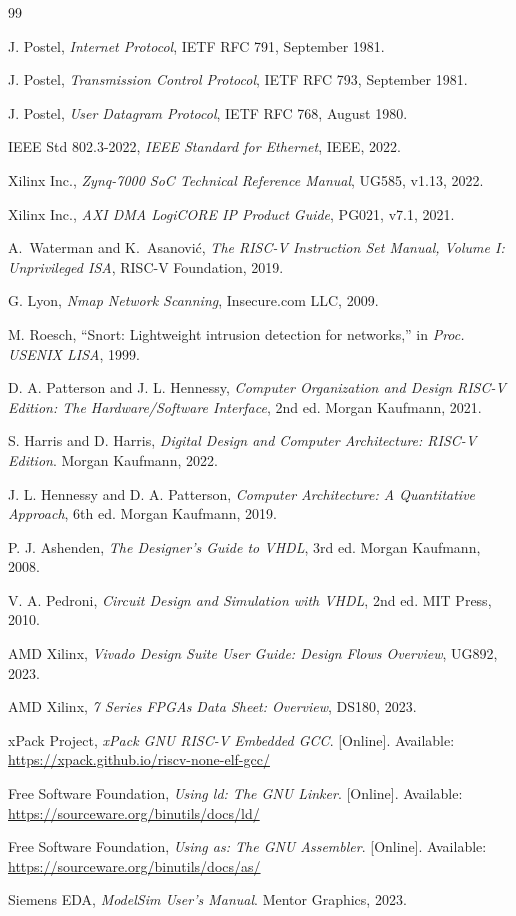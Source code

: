 \documentclass[16pt]{mythesis}
\begin{document}
\begin{thebibliography}{99}
	
	J. Postel, \textit{Internet Protocol}, IETF RFC 791, September 1981.
	
	J. Postel, \textit{Transmission Control Protocol}, IETF RFC 793, September 1981.
	
	J. Postel, \textit{User Datagram Protocol}, IETF RFC 768, August 1980.
	
	IEEE Std 802.3-2022, \textit{IEEE Standard for Ethernet}, IEEE, 2022.
	
	Xilinx Inc., \textit{Zynq-7000 SoC Technical Reference Manual}, UG585, v1.13, 2022.
	
	Xilinx Inc., \textit{AXI DMA LogiCORE IP Product Guide}, PG021, v7.1, 2021.
	
	A.~Waterman and K.~Asanovi\'c, \textit{The RISC-V Instruction Set Manual, Volume I: Unprivileged ISA}, RISC-V Foundation, 2019.
	
	G. Lyon, \textit{Nmap Network Scanning}, Insecure.com LLC, 2009.
	
	M. Roesch, ``Snort: Lightweight intrusion detection for networks,'' in \textit{Proc. USENIX LISA}, 1999.
	
	D. A. Patterson and J. L. Hennessy, \textit{Computer Organization and Design RISC-V Edition: The Hardware/Software Interface}, 2nd ed. Morgan Kaufmann, 2021.
	
	S. Harris and D. Harris, \textit{Digital Design and Computer Architecture: RISC-V Edition}. Morgan Kaufmann, 2022.
	
	J. L. Hennessy and D. A. Patterson, \textit{Computer Architecture: A Quantitative Approach}, 6th ed. Morgan Kaufmann, 2019.
	
	P. J. Ashenden, \textit{The Designer's Guide to VHDL}, 3rd ed. Morgan Kaufmann, 2008.
	
	V. A. Pedroni, \textit{Circuit Design and Simulation with VHDL}, 2nd ed. MIT Press, 2010.
	
	AMD Xilinx, \textit{Vivado Design Suite User Guide: Design Flows Overview}, UG892, 2023.
	
	AMD Xilinx, \textit{7 Series FPGAs Data Sheet: Overview}, DS180, 2023.
	
	xPack Project, \textit{xPack GNU RISC-V Embedded GCC}. [Online]. Available: \url{https://xpack.github.io/riscv-none-elf-gcc/}
	
	Free Software Foundation, \textit{Using ld: The GNU Linker}. [Online]. Available: \url{https://sourceware.org/binutils/docs/ld/}
	
	Free Software Foundation, \textit{Using as: The GNU Assembler}. [Online]. Available: \url{https://sourceware.org/binutils/docs/as/}
	
	Siemens EDA, \textit{ModelSim User's Manual}. Mentor Graphics, 2023.
	
\end{thebibliography}
%
\end{document}
